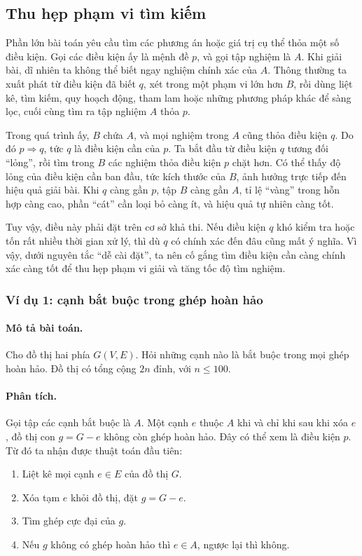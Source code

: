 \documentclass[11pt]{article}
\begin{document}
\subsection{Thu hẹp phạm vi tìm kiếm}

Phần lớn bài toán yêu cầu tìm các phương án hoặc giá trị cụ thể thỏa một số
điều kiện. Gọi các điều kiện ấy là mệnh đề $p$, và gọi tập nghiệm là $A$.
Khi giải bài, dĩ nhiên ta không thể biết ngay nghiệm chính xác của $A$. Thông
thường ta xuất phát từ điều kiện đã biết $q$, xét trong một phạm vi lớn hơn
$B$, rồi dùng liệt kê, tìm kiếm, quy hoạch động, tham lam hoặc những phương
pháp khác để sàng lọc, cuối cùng tìm ra tập nghiệm $A$ thỏa $p$.

Trong quá trình ấy, $B$ chứa $A$, và mọi nghiệm trong $A$ cũng thỏa điều kiện
$q$. Do đó $p\Rightarrow q$, tức $q$ là điều kiện cần của $p$. Ta bắt đầu từ
điều kiện $q$ tương đối ``lỏng'', rồi tìm trong $B$ các nghiệm thỏa điều kiện
$p$ chặt hơn. Có thể thấy độ lỏng của điều kiện cần ban đầu, tức kích thước
của $B$, ảnh hưởng trực tiếp đến hiệu quả giải bài. Khi $q$ càng gần $p$, tập
$B$ càng gần $A$, tỉ lệ ``vàng'' trong hỗn hợp càng cao, phần ``cát'' cần
loại bỏ càng ít, và hiệu quả tự nhiên càng tốt.

Tuy vậy, điều này phải đặt trên cơ sở khả thi. Nếu điều kiện $q$ khó kiểm tra
hoặc tốn rất nhiều thời gian xử lý, thì dù $q$ có chính xác đến đâu cũng mất
ý nghĩa. Vì vậy, dưới nguyên tắc ``dễ cài đặt'', ta nên cố gắng tìm điều kiện
cần càng chính xác càng tốt để thu hẹp phạm vi giải và tăng tốc độ tìm
nghiệm.

\subsubsection*{Ví dụ 1: cạnh bắt buộc trong ghép hoàn hảo}

\paragraph{Mô tả bài toán.}
Cho đồ thị hai phía $G(V,E)$. Hỏi những cạnh nào là bắt buộc trong mọi ghép
hoàn hảo. Đồ thị có tổng cộng $2n$ đỉnh, với $n\le 100$.

\paragraph{Phân tích.}
Gọi tập các cạnh bắt buộc là $A$. Một cạnh $e$ thuộc $A$ khi và chỉ khi sau
khi xóa $e$, đồ thị con $g=G-e$ không còn ghép hoàn hảo. Đây có thể xem là
điều kiện $p$. Từ đó ta nhận được thuật toán đầu tiên:
\begin{enumerate}
  \item Liệt kê mọi cạnh $e\in E$ của đồ thị $G$.
  \item Xóa tạm $e$ khỏi đồ thị, đặt $g=G-e$.
  \item Tìm ghép cực đại của $g$.
  \item Nếu $g$ không có ghép hoàn hảo thì $e\in A$, ngược lại thì không.
\end{enumerate}
\end{document}
